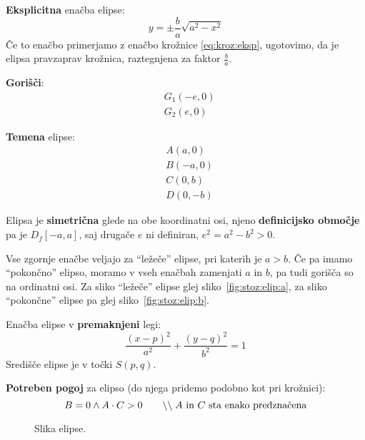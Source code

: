 \documentclass[a4paper,oneside,12pt,fleqn]{article}
\newcommand\krat\cdot
\newcommand{\comment}[1]{\ensuremath{\qquad\backslash\backslash\;}\textnormal{#1}}
\newcommand{\beforecaptionskip}{\vspace{-12pt}}
\numberwithin{equation}{section}
\begin{document}
\textbf{Eksplicitna} enačba elipse:
\[ y = \pm \frac{b}{a} \sqrt{a^2 - x^2} \]
Če to enačbo primerjamo z enačbo krožnice \eqref{eq:kroz:eksp}, ugotovimo, da je elipsa
pravzaprav krožnica, raztegnjena za faktor $\frac{b}{a}$.

\textbf{Gorišči}:
\begin{align*}
 &G_1(-e, 0) \\
 &G_2(e, 0)
\end{align*}

\textbf{Temena} elipse:
\begin{align*}
  &A(a,0) \\
  &B(-a, 0) \\
  &C(0, b) \\
  &D(0,-b)
\end{align*}

Elipsa je \textbf{simetrična} glede na obe koordinatni osi, njeno \textbf{definicijsko območje} pa je
$D_f[-a, a]$, saj drugače $e$ ni definiran, $e^2 = a^2 - b^2 > 0$.

Vse zgornje enačbe veljajo za ``ležeče'' elipse, pri katerih je $a > b$. Če pa imamo
``pokončno'' elipso, moramo v vseh enačbah zamenjati $a$ in $b$, pa tudi gorišča so na
ordinatni osi. Za sliko ``ležeče'' elipse glej sliko~\ref{fig:stoz:elip:a}, za sliko
``pokončne'' elipse pa glej sliko~\ref{fig:stoz:elip:b}.

Enačba elipse v \textbf{premaknjeni} legi:
\[ \frac{(x-p)^2}{a^2} + \frac{(y-q)^2}{b^2} = 1 \]
Središče elipse je v točki $S(p,q)$.

\textbf{Potreben pogoj} za elipso (do njega pridemo podobno kot pri krožnici):
\[ B = 0 \land A \krat C > 0 \comment{$A$ in $C$ sta enako predznačena} \]

\begin{figure}[ht]
  \begin{center}
  \end{center}
  \beforecaptionskip
  \caption{Slika elipse.}
  \label{fig:stoz:elip}
\end{figure}
\end{document}
